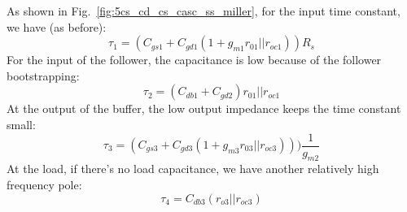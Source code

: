 \noindent As shown in Fig.~\ref{fig:5cs_cd_cs_casc_ss_miller}, for the input time constant, we have (as before):   
    \begin{equation} 
        \tau_1 = (C_{gs1} + C_{gd1} (1 + g_{m1} r_{01}||r_{oc1})) R_s 
    \end{equation}
For the input of the follower, the capacitance is low because of the follower bootstrapping:
    \begin{equation} 
        \tau_2 = (C_{db1} + C_{gd2} ) r_{01}||r_{oc1} 
    \end{equation}
At the output of the buffer, the low output impedance keeps the time constant small:
    \begin{equation}  
        \tau_3 = (C_{gs3} + C_{gd3} (1 + g_{m3} r_{03}||r_{oc3}))) \frac{1}{g_{m2}} 
    \end{equation}
At the load, if there's no load capacitance, we have another relatively high frequency pole:
    \begin{equation}  
        \tau_4 = C_{db3} (r_{o3} || r_{oc3})
    \end{equation}
\section{\topicC}
